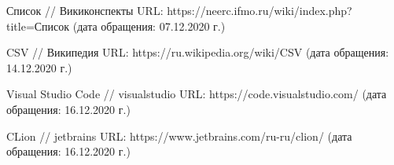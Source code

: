 
\begin{thebibliography}{9} 
    Список
    // Викиконспекты
    URL: https://neerc.ifmo.ru/wiki/index.php?title=Список
    (дата обращения: 07.12.2020 г.)
    
    CSV
    // Википедия
    URL: https://ru.wikipedia.org/wiki/CSV
    (дата обращения: 14.12.2020 г.)
    
    Visual Studio Code
    // visualstudio
    URL: https://code.visualstudio.com/
    (дата обращения: 16.12.2020 г.)
    
    CLion
    // jetbrains
    URL: https://www.jetbrains.com/ru-ru/clion/
    (дата обращения: 16.12.2020 г.)
\end{thebibliography}